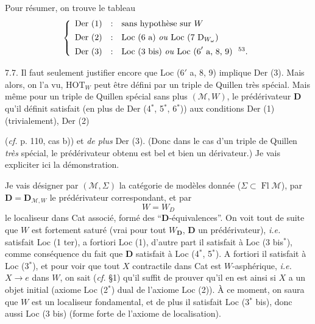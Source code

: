 \documentclass[11pt]{article}
\newcommand{\printedpage}[1]{\marginpar{\footnotesize p.~#1}}
\newcommand{\msp}[1]{\marginpar{\footnotesize [#1]}}
\begin{document}
Pour résumer, on trouve le tableau
\[
\left\{
\begin{array}{lcl}
\text{Der (1)} & : & \text{sans hypothèse sur } W \\[1ex]
\text{Der (2)} & : & \text{Loc (6 a) \textit{ou} Loc (7 }\mathrm{D}_{W_\omega}\text{)} \\[1ex]
\text{Der (3)} & : & \text{Loc (3 bis) \textit{ou} Loc (6}'\text{ a, 8, 9)\ \ \footnotemark[53].}
\end{array}
\right.
\]

7.7. Il faut seulement justifier encore que Loc (6$'$ a, 8, 9) implique Der (3). Mais alors, on l'a vu, $\mathrm{HOT}_W$ peut être défini par un triple de Quillen très spécial. Mais même pour un triple de Quillen spécial sans plus $(\mathcal{M},W)$, le prédérivateur $\mathbf{D}$ qu'il définit satisfait (en plus de Der (4$^*$, 5$^*$, 6$^*$)) aux conditions Der (1) (trivialement), Der (2)

\printedpage{54}
\msp{page 114}
(\textit{cf.} p. 110, cas b)) et \textit{de plus} Der (3). (Donc dans le cas d'un triple de Quillen \textit{très} spécial, le prédérivateur obtenu est bel et bien un dérivateur.) Je vais expliciter ici la démonstration.

Je vais désigner par $(\mathcal{M},\Sigma)$ la catégorie de modèles donnée ($\Sigma\subset\operatorname{Fl}\mathcal{M}$), par $\mathbf{D}=\mathbf{D}_{\mathcal{M},W}$ le prédérivateur correspondant, et par
\[ W=W_D \] %
le localiseur dans Cat associé, formé des ``$\mathbf{D}$-équivalences''. On voit tout de suite que $W$ est fortement saturé (vrai pour tout $W_{\mathbf{D}}$, $\mathbf{D}$ un prédérivateur), \textit{i.e.} satisfait Loc (1 ter), a fortiori Loc (1), d'autre part il satisfait à Loc (3 bis$^*$), comme conséquence du fait que $\mathbf{D}$ satisfait à Loc (4$^*$, 5$^*$). A fortiori il satisfait à Loc (3$^*$), et pour voir que tout $X$ contractile dans Cat est $W$-asphérique, \textit{i.e.} $X\longrightarrow e$ dans $W$, on sait (\textit{cf.} §1)
\msp{page 115}
qu'il suffit de prouver qu'il en est ainsi si $X$ a un objet initial (axiome Loc (2$^*$) dual de l'axiome Loc (2)). À ce moment, on saura que $W$ est un localiseur fondamental, et de plus il satisfait Loc (3$^*$ bis), donc aussi Loc (3 bis) (forme forte de l'axiome de localisation).
\end{document}
